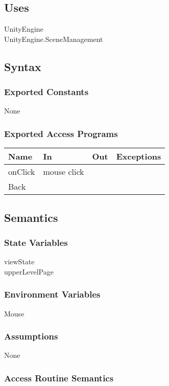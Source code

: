 \documentclass[12pt, titlepage]{article}
\begin{document}
\subsection{Uses}
UnityEngine\\
UnityEngine.SceneManagement\\

\subsection{Syntax}
\subsubsection{Exported Constants}
None
\subsubsection{Exported Access Programs}

\begin{center}
\begin{tabular}{|l|l|l|p{5cm}|}
\hline
\textbf{Name} & \textbf{In} & \textbf{Out} & \textbf{Exceptions} \\
\hline
onClick & mouse click &  &  \\
\hline
Back & &  & \\
\hline
\end{tabular}
\end{center}

\subsection{Semantics}

\subsubsection{State Variables}
viewState\\
upperLevelPage

\subsubsection{Environment Variables}
Mouse
\subsubsection{Assumptions}
None
\subsubsection{Access Routine Semantics}
\end{document}
